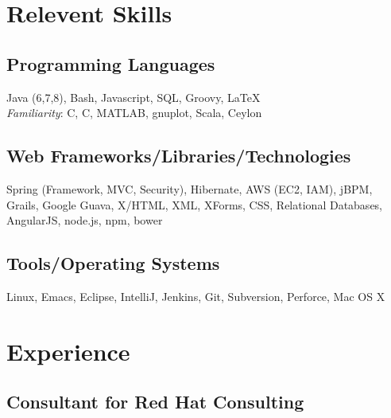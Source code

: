 \documentclass[a4paper,11pt]{article}
\newcommand{\CC}{C\nolinebreak\hspace{-.05em}\raisebox{.4ex}{\tiny\bf
    +}\nolinebreak\hspace{-.10em}\raisebox{.4ex}{\tiny\bf +}}
\def\CC{{C\nolinebreak[4]\hspace{-.05em}\raisebox{.4ex}{\tiny\bf ++}}}
\begin{document}

  \section*{Relevent Skills}

  \begin{multicols}{2}
    \raggedright

    \subsection*{Programming Languages}

    Java (6,7,8), Bash, Javascript, SQL, Groovy, \LaTeX \\
    \textsl{Familiarity}: C, \CC, MATLAB, gnuplot, Scala, Ceylon

    \subsection*{Web Frameworks/Libraries/Technologies}

    Spring (Framework, MVC, Security), Hibernate, AWS (EC2, IAM), jBPM, Grails, Google Guava,
    X/HTML, XML, XForms, CSS, Relational Databases, AngularJS, node.js, npm, bower
    
    \subsection*{Tools/Operating Systems}

    Linux, Emacs, Eclipse, IntelliJ, Jenkins, Git, Subversion, Perforce, Mac OS
    X
    
  \end{multicols}
  

\section*{Experience}

\subsection*{Consultant for Red Hat Consulting}
\end{document}
